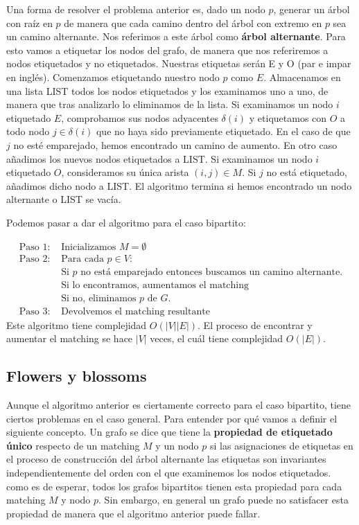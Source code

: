 \documentclass[twoside,12pt]{article}
\begin{document}
Una forma de resolver el problema anterior es, dado un nodo $p$, generar un árbol con raíz en $p$ de manera que cada camino dentro del árbol con extremo en $p$ sea un camino alternante. Nos referimos a este árbol como \textbf{árbol alternante}. Para esto vamos a etiquetar los nodos del grafo, de manera que nos referiremos a nodos etiquetados y no etiquetados. Nuestras etiquetas serán E y O (par e impar en inglés). Comenzamos etiquetando nuestro nodo $p$ como $E$. Almacenamos en una lista LIST todos los nodos etiquetados y los examinamos uno a uno, de manera que tras analizarlo lo eliminamos de la lista. Si examinamos un nodo $i$ etiquetado $E$, comprobamos sus nodos adyacentes $\delta(i)$ y etiquetamos con $O$ a todo nodo $j\in \delta(i)$ que no haya sido previamente etiquetado. En el caso de que $j$ no esté emparejado, hemos encontrado un camino de aumento. En otro caso añadimos los nuevos nodos etiquetados a LIST. Si examinamos un nodo $i$ etiquetado $O$, consideramos su única arista $(i,j) \in M$. Si $j$ no está etiquetado, añadimos dicho nodo a LIST. El algoritmo termina si hemos encontrado un nodo alternante o LIST se vacía. 

Podemos pasar a dar el algoritmo para el caso bipartito:

\begin{align*}
\text{Paso 1: }&\text{Inicializamos $M=\emptyset$}\\
\text{Paso 2: }&\text{Para cada $p \in V$:}\\
&\text{Si $p$ no está emparejado entonces buscamos un camino alternante.}\\
&\text{Si lo encontramos, aumentamos el matching}\\
&\text{Si no, eliminamos $p$ de $G$.}\\
\text{Paso 3: }& \text{Devolvemos el matching resultante}
\end{align*} 
Este algoritmo tiene complejidad $O(|V||E|)$. El proceso de encontrar y aumentar el matching se hace $|V|$ veces, el cuál tiene complejidad $O(|E|)$.
\subsection{Flowers y blossoms}
Aunque el algoritmo anterior es ciertamente correcto para el caso bipartito, tiene ciertos problemas en el caso general. Para entender por qué vamos a definir el siguiente concepto. Un grafo se dice que tiene la \textbf{propiedad de etiquetado único} respecto de un matching $M$ y un nodo $p$ si las asignaciones de etiquetas en el proceso de construcción del árbol alternante las etiquetas son invariantes independientemente del orden con el que examinemos los nodos etiquetados. como es de esperar, todos los grafos bipartitos tienen esta propiedad para cada matching $M$ y nodo $p$. Sin embargo, en general un grafo puede no satisfacer esta propiedad de manera que el algoritmo anterior puede fallar. 
\end{document}
